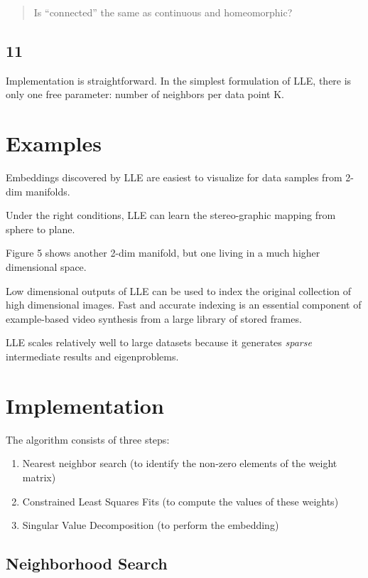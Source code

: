 \documentclass[11pt]{article}
\begin{document}
\begin{quote}
Is ``connected'' the same as continuous and homeomorphic?
\end{quote}
\subsection{11}
\label{sec:org82ba933}
Implementation is straightforward. In the simplest formulation of LLE, there is
only one free parameter: number of neighbors per data point K.

\section{Examples}
\label{sec:orge59e5fc}

Embeddings discovered by LLE are easiest to visualize for data samples from
2-dim manifolds.

Under the right conditions, LLE can learn the stereo-graphic mapping from sphere
to plane.

Figure 5 shows another 2-dim manifold, but one living in a much higher
dimensional space.

Low dimensional outputs of LLE can be used to index the original collection of
high dimensional images. Fast and accurate indexing is an essential component of
example-based video synthesis from a large library of stored frames.

LLE scales relatively well to large datasets because it generates \emph{sparse}
intermediate results and eigenproblems.

\section{Implementation}
\label{sec:orge00e9a0}

The algorithm consists of three steps:
\begin{enumerate}
\item Nearest neighbor search (to identify the non-zero elements of the weight
matrix)
\item Constrained Least Squares Fits (to compute the values of these weights)
\item Singular Value Decomposition (to perform the embedding)
\end{enumerate}

\subsection{Neighborhood Search}
\label{sec:org2e7decc}
\end{document}
